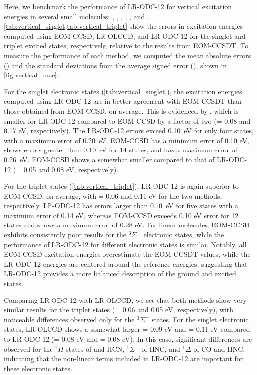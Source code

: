 Here, we benchmark the performance of LR-ODC-12 for vertical excitation
energies in several small molecules: , , , ,
, and . 
\cref{tab:vertical_singlet,tab:vertical_triplet} show the errors in excitation
energies computed using EOM-CCSD, LR-OLCCD, and LR-ODC-12 for the singlet and
triplet excited states, respectively, relative to the results from EOM-CCSDT\@. To measure the performance of each method, we computed the mean absolute errors (\mae) and the standard deviations from the average signed error (\std), shown in \cref{fig:vertical_mae}.

For the singlet electronic states (\cref{tab:vertical_singlet}), the excitation energies computed using LR-ODC-12 are in better agreement with EOM-CCSDT than those obtained from EOM-CCSD, on average. This is evidenced by \mae, which is smaller for LR-ODC-12 compared to EOM-CCSD by a factor of two (\mae = 0.08 and 0.17 eV, respectively). The LR-ODC-12 errors exceed 0.10~eV for only four states, with a maximum error of 0.20~eV. EOM-CCSD has a minimum error of 0.10 eV, shows errors greater than 0.10~eV for 14 states, and has a maximum error of 0.26~eV. EOM-CCSD shows a somewhat smaller \std compared to that of LR-ODC-12 (\std = 0.05 and 0.08 eV, respectively).

For the triplet states (\cref{tab:vertical_triplet}), LR-ODC-12 is again superior to EOM-CCSD, on average, with \mae = 0.06 and 0.11 eV for the two methods, respectively. LR-ODC-12 has errors larger than 0.10~eV for five states with a maximum error of 0.14 eV, whereas EOM-CCSD exceeds 0.10 eV error for 12 states and shows a maximum error of 0.28 eV. For linear molecules, EOM-CCSD exhibits consistently poor results for the \({}^3\Sigma^-\) electronic states, while the performance of LR-ODC-12 for different electronic states is similar. Notably, all EOM-CCSD excitation energies overestimate the EOM-CCSDT values, while the LR-ODC-12 energies are centered around the reference energies, suggesting that LR-ODC-12 provides a more balanced description of the ground and excited states.

Comparing LR-ODC-12 with LR-OLCCD, we see that both methods show very similar results for the triplet states (\mae = 0.06 and 0.05 eV, respectively), with noticeable differences observed only for the \({}^3\Sigma^-\) states. For the singlet electronic states, LR-OLCCD shows a somewhat larger \mae = 0.09 eV and \std = 0.11 eV compared to LR-ODC-12 (\mae = 0.08 eV and \std = 0.08 eV). In this case, significant differences are observed for the \({}^1\Pi\) states of  and HCN, \({}^1\Sigma^-\) of HNC, and \({}^1\Delta\) of CO and HNC, indicating that the non-linear terms included in LR-ODC-12 are important for these electronic states. 

